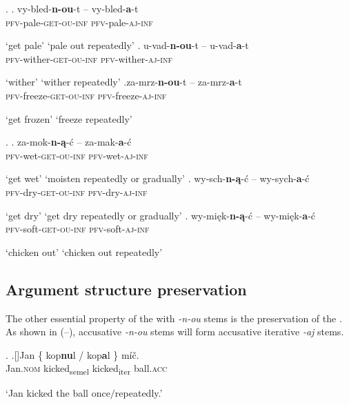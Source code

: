 \ex. 
\ag. vy-bled-\textbf{n-ou}-t -- vy-bled-\textbf{a}-t\\
\textsc{pfv}-pale-\textsc{get-ou}-\textsc{inf} {} \textsc{pfv}-pale-\textsc{aj}-\textsc{inf}\\
\strut `get pale' \hskip 62pt `pale out repeatedly'
\bg. u-vad-\textbf{n-ou}-t -- u-vad-\textbf{a}-t\\
\textsc{pfv}-wither-\textsc{get-ou}-\textsc{inf} {} \textsc{pfv}-wither-\textsc{aj}-\textsc{inf}\\
\strut `wither' \hskip 77.5pt `wither repeatedly'
\cg.za-mrz-\textbf{n-ou}-t -- za-mrz-\textbf{a}-t\\
\textsc{pfv}-freeze-\textsc{get-ou}-\textsc{inf} {} \textsc{pfv}-freeze-\textsc{aj}-\textsc{inf}\\
\strut `get frozen' \hskip 60pt `freeze repeatedly'

\ex. 
\ag.	
za-mok-\textbf{n-\k{a}}-\'c -- za-mak-\textbf{a}-\'c \\
\textsc{pfv}-wet-\textsc{get-ou}-\textsc{inf} {} \textsc{pfv}-wet-\textsc{aj}-\textsc{inf}\\
\strut `get wet' \hskip 62pt `moisten repeatedly or gradually'
\bg.
wy-sch-\textbf{n-\k{a}}-\'c -- wy-sych-\textbf{a}-\'c \\
\textsc{pfv}-dry-\textsc{get-ou}-\textsc{inf} {} \textsc{pfv}-dry-\textsc{aj}-\textsc{inf}\\
\strut `get dry' \hskip 61.5pt `get dry repeatedly or gradually'
\cg.
wy-mi\k{e}k-\textbf{n-\k{a}}-\'c -- wy-mi\k{e}k-\textbf{a}-\'c\\
\textsc{pfv}-soft-\textsc{get-ou}-\textsc{inf} {} \textsc{pfv}-soft-\textsc{aj}-\textsc{inf}\\
\strut `chicken out' \hskip 42pt `chicken out repeatedly'


\subsection{Argument structure preservation}

The other essential property of the   with \textit{-n-ou} stems is the preservation of the . As shown in (--), accusative  \textit{-n-ou}  stems will form accusative iterative \textit{-aj} stems. 

\ex.\label{pres1} 
\ag.[]\hspace{-22pt}Jan \{ kop\textbf{nu}l  {/} {kop\textbf{a}l \}} m\'i\v{c}.\\
\hspace{-22pt}Jan.\textsc{nom} {}  kicked\textsubscript{semel} {}  {kicked\textsubscript{iter}}  ball.\textsc{acc}\\ 
\hspace{-22pt}\strut `Jan kicked the ball once$\slash$repeatedly.'

